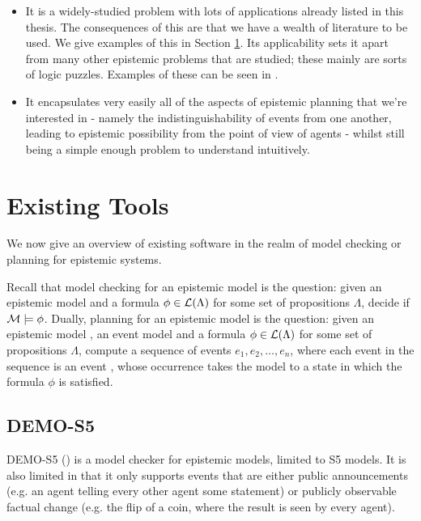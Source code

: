 \documentclass[10pt, a4paper]{report}
\begin{document}
\begin{itemize}
\item It is a widely-studied problem with lots of applications already listed in
  this thesis. The consequences of this are that we have a wealth of literature
  to be used. We give examples of this in Section \ref{sec:ExistingTools}. Its
  applicability sets it apart from many other epistemic problems that are
  studied; these mainly are sorts of logic puzzles. Examples of these can be
  seen in \cite{DEMO-S5}.
\item It encapsulates very easily all of the aspects of epistemic planning that
  we're interested in - namely the indistinguishability of events from one
  another, leading to epistemic possibility from the point of view of agents -
  whilst still being a simple enough problem to understand intuitively.  
\end{itemize}

\section{Existing Tools}
\label{sec:ExistingTools}

We now give an overview of existing software in the realm of model checking or
planning for epistemic systems.

Recall that model checking for an epistemic model is the question: given an
epistemic model  and a formula $\phi \in \mathcal{L}(\Lambda)$ for some set of
propositions $\Lambda$, decide if $\mathcal{M} \models \phi$. Dually, planning for an
epistemic model is the question: given an epistemic model , an event
model  and a formula $\phi \in \mathcal{L}(\Lambda)$ for some set of
propositions $\Lambda$, compute a sequence of events $e_1, e_2, \ldots, e_n$,
where each event in the sequence is an event , whose occurrence takes the
model  to a state in which the formula $\phi$ is satisfied. 

\subsection{DEMO-S5}

DEMO-S5 (\cite{DEMO-S5}) is a model checker for epistemic models, limited to
\textsf{S5} models. It is also limited in that it only supports events that are either
public announcements (e.g. an agent telling every other agent some statement) or
publicly observable factual change (e.g. the flip of a coin, where the result is
seen by every agent).
\end{document}
